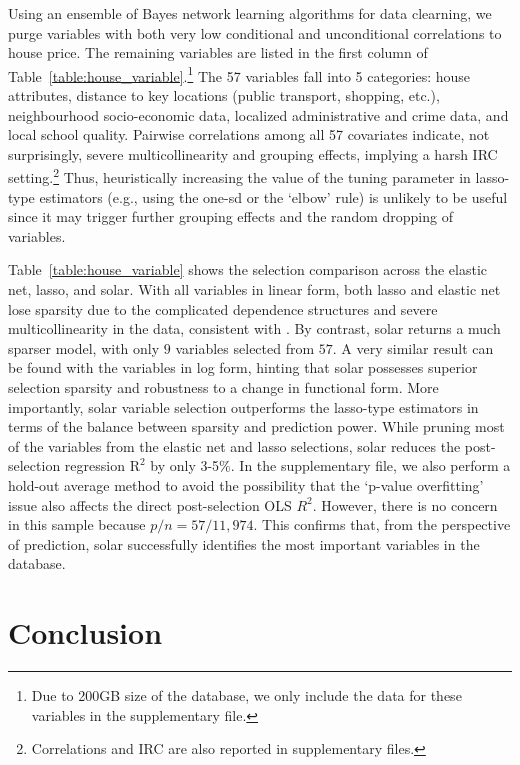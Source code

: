 \documentclass[11pt,review,authoryear]{elsarticle}
\begin{document}
Using an ensemble of Bayes network learning algorithms for data clearning, we purge variables with both very low conditional and unconditional correlations to house price. The remaining variables are listed in the first column of Table~\ref{table:house_variable}.\footnote{Due to 200GB size of the database, we only include the data for these variables in the supplementary file.} The 57 variables fall into 5 categories: house attributes, distance to key locations (public transport, shopping, etc.), neighbourhood socio-economic data, localized administrative and crime data, and local school quality. Pairwise correlations among all 57 covariates indicate, not surprisingly, severe multicollinearity and grouping effects, implying a harsh IRC setting.\footnote{Correlations and IRC are also reported in supplementary files.} Thus, heuristically increasing the value of the tuning parameter in lasso-type estimators (e.g., using the one-sd or the `elbow' rule) is unlikely to be useful since it may trigger further grouping effects and the random dropping of variables.

Table~\ref{table:house_variable} shows the selection comparison across the elastic net, lasso, and solar. With all variables in linear form, both lasso and elastic net lose sparsity due to the complicated dependence structures and severe multicollinearity in the data, consistent with \citet{jia2010model}. By contrast, solar returns a much sparser model, with only $9$ variables selected from $57$. A very similar result can be found with the variables in log form, hinting that solar possesses superior selection sparsity and robustness to a change in functional form. More importantly, solar variable selection outperforms the lasso-type estimators in terms of the balance between sparsity and prediction power. While pruning most of the variables from the elastic net and lasso selections, solar reduces the post-selection regression $\mathrm{R}^2$ by only 3-5\%. In the supplementary file, we also perform a hold-out average method to avoid the possibility that the `p-value overfitting' issue also affects the direct post-selection OLS $R^2$. However, there is no concern in this sample because $p/n=57/11,974$. This confirms that, from the perspective of prediction, solar successfully identifies the most important variables in the database.


\section{Conclusion}
\end{document}
